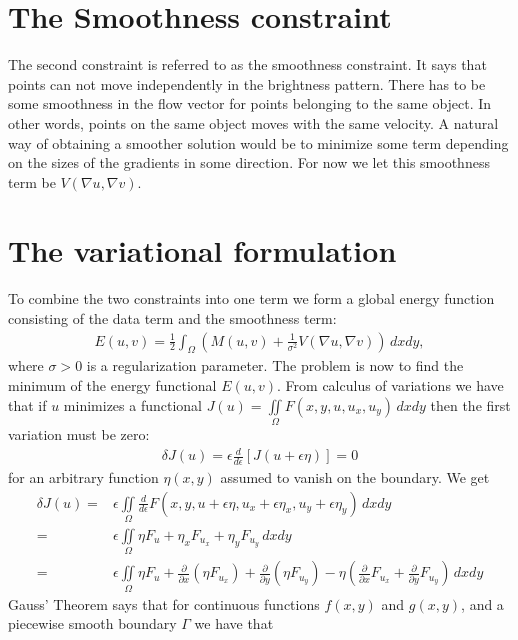\documentclass[10pt,a4paper]{article}
\begin{document}
\section{The Smoothness constraint}
The second constraint is referred to as the smoothness constraint. It says that points can not move independently in the brightness pattern. There has to be some smoothness in the flow vector for points belonging to the same object. In other words, points on the same object moves with the same velocity. A natural way of obtaining a smoother solution would be to minimize some term depending on the sizes of the gradients in some direction. For now we let this smoothness term be $V(\nabla u, \nabla v)$.

\section{The variational formulation}
To combine the two constraints into one term we form a global energy function consisting of the data term and the smoothness term:
\begin{align}
E(u,v) = \frac{1}{2} \int_\Omega (M(u,v) + \frac{1}{\sigma^2} V(\nabla u, \nabla v)) \, dx dy,
\end{align}
where $\sigma > 0$ is a regularization parameter. The problem is now to find the minimum of the energy functional $E(u,v)$. From calculus of variations we have that if $u$ minimizes a functional $J(u) = \iint \limits_\Omega F(x,y,u,u_x,u_y) \, dxdy$ then the first variation must be zero:
\begin{align*}
\delta J(u) = \epsilon \frac{d}{d \epsilon} \left[ J(u + \epsilon \eta) \right] = 0 
\end{align*}
for an arbitrary function $\eta(x,y)$ assumed to vanish on the boundary. We get
\begin{align*}
\delta J(u) =& \epsilon \iint \limits_{\Omega} \frac{d}{d \epsilon} F(x,y,u + \epsilon \eta, u_x + \epsilon \eta_x, u_y + \epsilon \eta_y) \, dxdy \\
=& \epsilon \iint \limits_{\Omega} \eta F_u + \eta_x F_{u_x} + \eta_y F_{u_y} \, dxdy \\
=& \epsilon \iint \limits_{\Omega} \eta F_u + \frac{\partial}{\partial x} (\eta F_{u_x}) + \frac{\partial }{\partial y} (\eta F_{u_y}) - \eta \left( \frac{\partial}{\partial x} F_{u_x} + \frac{\partial }{\partial y} F_{u_y} \right) \, dxdy
\end{align*}
Gauss' Theorem says that for continuous functions $f(x,y)$ and $g(x,y)$, and a piecewise smooth boundary $\Gamma$ we have that 
\end{document}
